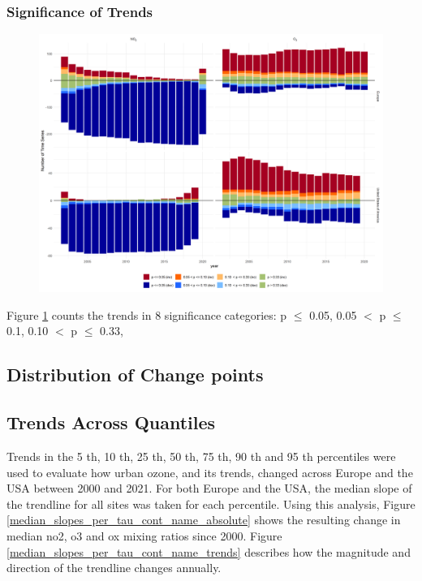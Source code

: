 \documentclass[journal abbreviation, manuscript]{copernicus}
\begin{document}






\subsubsection{Significance of Trends}

\begin{figure}[htbp]
\includegraphics[width=12cm]{plots/p_bar_year.png}
\caption{}
\label{fig:p_bar_year}
\end{figure}

Figure \ref{fig:p_bar_year} counts the trends in 8 significance categories: p $\le$ 0.05, 0.05 $<$ p $\le$ 0.1, 0.10 $<$ p $\le$ 0.33,


\subsection{Distribution of Change points}

\subsection{Trends Across Quantiles}

Trends in the 5 th, 10 th, 25 th, 50 th, 75 th, 90 th and 95 th percentiles were used to evaluate how urban ozone, and its trends, changed across Europe and the USA between 2000 and 2021. For both Europe and the USA, the median slope of the trendline for all sites was taken for each percentile. Using this analysis, Figure \ref{median_slopes_per_tau_cont_name_absolute} shows the resulting change in median no2, o3 and ox mixing ratios since 2000. Figure \ref{median_slopes_per_tau_cont_name_trends} describes how the magnitude and direction of the trendline changes annually.
\end{document}
